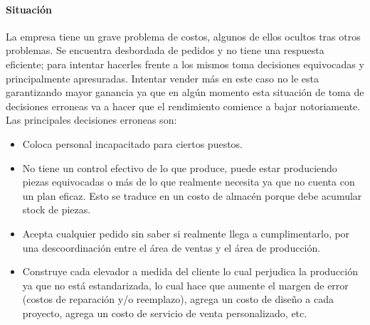 \documentclass[12pt,a4paper,spanish]{article}
\begin{document}
\paragraph{Situaci\'on}
La empresa tiene un grave problema de costos, algunos de ellos ocultos tras otros problemas. Se encuentra desbordada de pedidos y no tiene una respuesta eficiente; para intentar hacerles frente a los mismos toma decisiones equivocadas y principalmente apresuradas. Intentar vender m\'as en este caso no le esta garantizando mayor ganancia ya que en alg\'un momento esta situaci\'on de toma de decisiones erroneas va a hacer que el rendimiento comience a bajar notoriamente. Las principales decisiones erroneas son:
	\begin{itemize}
 		\item Coloca personal incapacitado para ciertos puestos. 
		\item No tiene un control efectivo de lo que produce, puede estar produciendo piezas equivocadas o m\'as de lo que realmente necesita ya que no cuenta con un plan eficaz. Esto se traduce en un costo de almac\'en porque debe acumular stock de piezas.
		\item Acepta cualquier pedido sin saber si realmente llega a cumplimentarlo, por una descoordinaci\'on entre el \'area de ventas y el \'area de producci\'on.
		\item Construye cada elevador a medida del cliente lo cual perjudica la producci\'on ya que no est\'a estandarizada, lo cual hace que aumente el margen de error (costos de reparaci\'on y/o reemplazo), agrega un costo de dise\~no a cada proyecto, agrega un costo de servicio de venta personalizado, etc.
	\end{itemize}
\end{document}
